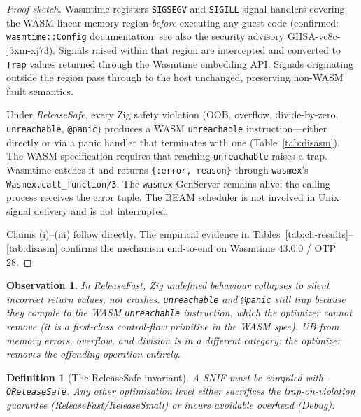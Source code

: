 \documentclass[11pt,a4paper]{article}
\newtheorem{definition}{Definition}
\newtheorem{observation}{Observation}
\begin{document}
\begin{proof}[Proof sketch]
Wasmtime registers \texttt{SIGSEGV} and \texttt{SIGILL} signal handlers
covering the WASM linear memory region \textit{before} executing any guest
code (confirmed: \texttt{wasmtime::Config} documentation; see also the
security advisory GHSA-vc8c-j3xm-xj73). Signals raised within that region
are intercepted and converted to \texttt{Trap} values returned through
the Wasmtime embedding API. Signals originating outside the region pass
through to the host unchanged, preserving non-WASM fault semantics.

Under \textit{ReleaseSafe}, every Zig safety violation (OOB, overflow,
divide-by-zero, \texttt{unreachable}, \texttt{@panic}) produces a WASM
\texttt{unreachable} instruction---either directly or via a panic handler
that terminates with one (Table~\ref{tab:disasm}). The WASM specification
requires that reaching \texttt{unreachable} raises a trap. Wasmtime catches
it and returns \texttt{\{:error, reason\}} through \texttt{wasmex}'s
\texttt{Wasmex.call\_function/3}. The \texttt{wasmex} GenServer remains
alive; the calling process receives the error tuple. The BEAM scheduler is
not involved in Unix signal delivery and is not interrupted.

Claims (i)--(iii) follow directly. The empirical evidence in
Tables~\ref{tab:cli-results}--\ref{tab:disasm} confirms the mechanism
end-to-end on Wasmtime 43.0.0 / OTP 28.
\end{proof}

\begin{observation}
In \textit{ReleaseFast}, Zig undefined behaviour collapses to silent incorrect
return values, not crashes. \texttt{unreachable} and \texttt{@panic} still
trap because they compile to the WASM \texttt{unreachable} instruction, which
the optimizer cannot remove (it is a first-class control-flow primitive in the
WASM spec). UB from memory errors, overflow, and division is in a different
category: the optimizer removes the offending operation entirely.
\end{observation}

\begin{definition}[The ReleaseSafe invariant]
A SNIF must be compiled with \texttt{-OReleaseSafe}. Any other optimisation
level either sacrifices the trap-on-violation guarantee
(\textit{ReleaseFast}/\textit{ReleaseSmall}) or incurs avoidable overhead
(\textit{Debug}).
\end{definition}

\end{document}
